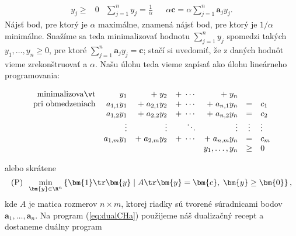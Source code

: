   \begin{align*}
    y_j\ge&0 & \sum_{j=1}^ny_j=\frac{1}{\alpha} && \alpha\bm{c}=\alpha\sum_{j=1}^n\bm{a}_jy_j.
  \end{align*}
  Nájsť bod, pre ktorý je $\alpha$ maximálne, znamená nájsť bod, pre ktorý je $1/\alpha$ minimálne.
  Snažíme sa teda minimalizovať hodnotu $\sum_{j=1}^ny_j$ spomedzi takých $y_1,\ldots,y_n\ge 0$, 
\noindent
  pre ktoré $\sum_{j=1}^n\bm{a}_jy_j=\bm{c}$; stačí si uvedomiť, že z daných hodnôt  vieme
  zrekonštruovať  a $\alpha$.
Našu úlohu teda vieme zapísať ako úlohu lineárneho programovania:

\begin{equation}
  \label{eq:dualCHa}
\begin{array}{rrrrrcl}
  {\rm minimalizovať}     & y_1        & +\;y_2         & +\; \cdots  & +\;y_n   \\
  {\rm pri\ obmedzeniach} & a_{1,1}y_1 & +\;a_{2,1}y_2   & +\; \cdots  & +\;a_{n,1}y_n  & = & c_1 \\
                          & a_{1,2}y_1 & +\;a_{2,2}y_2   & +\; \cdots  & +\;a_{n,2}y_n  & = & c_2 \\
                          &   \vdots   &   \vdots       &   \ddots   &  \vdots      &  \vdots & \vdots\\ 
                          & a_{1,m}y_1 & +\; a_{2,m}y_2   & +\; \cdots  & +\;a_{n,m}y_n  & = & c_m \\
                          &\multicolumn{4}{r}{y_1,\ldots,y_n}&\ge&0
\end{array}
\end{equation}

\noindent
alebo skrátene
$$\text{(P)}\;\; \min_{\bm{y}\in\R^n}\left\{ \bm{1}\tr\bm{y} \mid A\tr\bm{y}=\bm{c},\;\bm{y}\ge\bm{0}\right\}, $$
kde $A$ je matica rozmerov $n\times m$, ktorej riadky sú tvorené súradnicami bodov $\bm{a}_1,\ldots,\bm{a}_n$.
Na program (\ref{eq:dualCHa}) použijeme náš dualizačný recept a dostaneme duálny program

